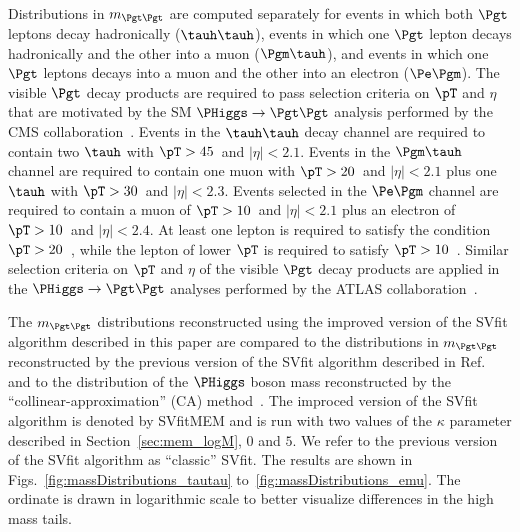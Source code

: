 Distributions in $m_{\Pgt\Pgt}$ are computed separately for events in which 
both $\Pgt$ leptons decay hadronically ($\tauh\tauh$), 
events in which one $\Pgt$ lepton decays hadronically and the other into a muon ($\Pgm\tauh$),
and events in which one $\Pgt$ leptons decays into a muon and the other into an electron ($\Pe\Pgm$).
The visible $\Pgt$ decay products are required to pass selection criteria on $\pT$ and $\eta$ 
that are motivated by the SM $\PHiggs \to \Pgt\Pgt$ analysis performed by the CMS collaboration~\cite{HIG-13-004}.
Events in the $\tauh\tauh$ decay channel are required to contain
two $\tauh$ with $\pT > 45$~\GeV and $\vert\eta\vert < 2.1$.
Events in the $\Pgm\tauh$ channel
are required to contain one muon with $\pT > 20$~\GeV and $\vert\eta\vert < 2.1$ plus one $\tauh$ with $\pT > 30$~\GeV and $\vert\eta\vert < 2.3$.
Events selected in the $\Pe\Pgm$ channel are required to contain a muon of $\pT > 10$~\GeV and $\vert\eta\vert < 2.1$ plus an electron of $\pT > 10$~\GeV and $\vert\eta\vert < 2.4$.
At least one lepton is required to satisfy the condition $\pT > 20$~\GeV, while the lepton of lower $\pT$ is required to satisfy $\pT > 10$~\GeV.
Similar selection criteria on $\pT$ and $\eta$ of the visible $\Pgt$ decay products are applied in the $\PHiggs \to \Pgt\Pgt$
analyses performed by the ATLAS
collaboration~\cite{ATLAS_HiggsTauTau_SM,ATLAS_HiggsTauTau_MSSM}.

The $m_{\Pgt\Pgt}$ distributions reconstructed using the 
improved version of the SVfit algorithm described in this paper
are compared to the distributions in $m_{\Pgt\Pgt}$ reconstructed by the previous version of the
SVfit algorithm described in Ref.~\cite{SVfit} and to the distribution of the $\PHiggs$ boson
mass reconstructed by the ``collinear-approximation'' (CA)
method~\cite{massRecoCollinearApprox}.
The improced version of the SVfit algorithm is denoted by SVfitMEM 
and is run with two values of the $\kappa$ parameter described in Section~\ref{sec:mem_logM}, $0$ and $5$.
We refer to the previous version of the SVfit algorithm as ``classic'' SVfit.
The results are shown in Figs.~\ref{fig:massDistributions_tautau} to~\ref{fig:massDistributions_emu}.
The ordinate is drawn in logarithmic scale to better visualize differences in the high mass tails.


